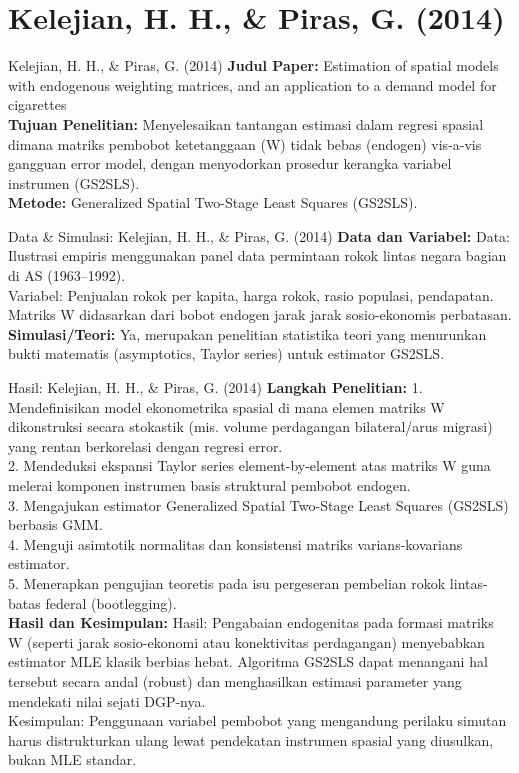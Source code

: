 \documentclass{beamer}
\begin{document}
\section{Kelejian, H. H., \& Piras, G. (2014)}
\begin{frame}[allowframebreaks]{Kelejian, H. H., \& Piras, G. (2014)}
\textbf{Judul Paper:} Estimation of spatial models with endogenous weighting matrices, and an application to a demand model for cigarettes \\[0.3cm]
\textbf{Tujuan Penelitian:} Menyelesaikan tantangan estimasi dalam regresi spasial dimana matriks pembobot ketetanggaan (W) tidak bebas (endogen) vis-a-vis gangguan error model, dengan menyodorkan prosedur kerangka variabel instrumen (GS2SLS). \\[0.3cm]
\textbf{Metode:} Generalized Spatial Two-Stage Least Squares (GS2SLS).
\end{frame}

\begin{frame}[allowframebreaks]{Data \& Simulasi: Kelejian, H. H., \& Piras, G. (2014)}
\textbf{Data dan Variabel:} Data: Ilustrasi empiris menggunakan panel data permintaan rokok lintas negara bagian di AS (1963–1992).\\ Variabel: Penjualan rokok per kapita, harga rokok, rasio populasi, pendapatan. Matriks W didasarkan dari bobot endogen jarak jarak sosio-ekonomis perbatasan. \\[0.3cm]
\textbf{Simulasi/Teori:} Ya, merupakan penelitian statistika teori yang menurunkan bukti matematis (asymptotics, Taylor series) untuk estimator GS2SLS.
\end{frame}

\begin{frame}[allowframebreaks]{Hasil: Kelejian, H. H., \& Piras, G. (2014)}
\textbf{Langkah Penelitian:} 1. Mendefinisikan model ekonometrika spasial di mana elemen matriks W dikonstruksi secara stokastik (mis. volume perdagangan bilateral/arus migrasi) yang rentan berkorelasi dengan regresi error.\\ 2. Mendeduksi ekspansi Taylor series element-by-element atas matriks W guna melerai komponen instrumen basis struktural pembobot endogen.\\ 3. Mengajukan estimator Generalized Spatial Two-Stage Least Squares (GS2SLS) berbasis GMM.\\ 4. Menguji asimtotik normalitas dan konsistensi matriks varians-kovarians estimator.\\ 5. Menerapkan pengujian teoretis pada isu pergeseran pembelian rokok lintas-batas federal (bootlegging). \\[0.3cm]
\textbf{Hasil dan Kesimpulan:} Hasil: Pengabaian endogenitas pada formasi matriks W (seperti jarak sosio-ekonomi atau konektivitas perdagangan) menyebabkan estimator MLE klasik berbias hebat. Algoritma GS2SLS dapat menangani hal tersebut secara andal (robust) dan menghasilkan estimasi parameter yang mendekati nilai sejati DGP-nya.\\ Kesimpulan: Penggunaan variabel pembobot yang mengandung perilaku simutan harus distrukturkan ulang lewat pendekatan instrumen spasial yang diusulkan, bukan MLE standar.
\end{frame}
\end{document}
